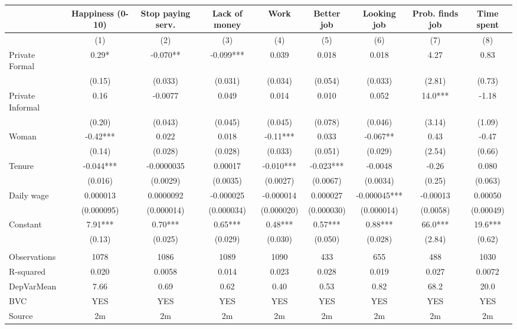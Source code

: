 \begin{tabular}{lcccccccc}
\toprule
      & Happiness (0-10) & Stop paying serv. & Lack of money & Work  & Better job & Looking job & Prob. finds job & Time spent \\
\midrule
\midrule
      & (1)   & (2)   & (3)   & (4)   & (5)   & (6)   & (7)   & (8) \\
\midrule
\midrule
Private Formal & 0.29* & -0.070** & -0.099*** & 0.039 & 0.018 & 0.018 & 4.27  & 0.83 \\
      & (0.15) & (0.033) & (0.031) & (0.034) & (0.054) & (0.033) & (2.81) & (0.73) \\
Private Informal & 0.16  & -0.0077 & 0.049 & 0.014 & 0.010 & 0.052 & 14.0*** & -1.18 \\
      & (0.20) & (0.043) & (0.045) & (0.045) & (0.078) & (0.046) & (3.14) & (1.09) \\
Woman & -0.42*** & 0.022 & 0.018 & -0.11*** & 0.033 & -0.067** & 0.43  & -0.47 \\
      & (0.14) & (0.028) & (0.028) & (0.033) & (0.051) & (0.029) & (2.54) & (0.66) \\
Tenure & -0.044*** & -0.0000035 & 0.00017 & -0.010*** & -0.023*** & -0.0048 & -0.26 & 0.080 \\
      & (0.016) & (0.0029) & (0.0035) & (0.0027) & (0.0067) & (0.0034) & (0.25) & (0.063) \\
Daily wage & 0.000013 & 0.0000092 & -0.000025 & -0.000014 & 0.000027 & -0.000045*** & -0.00013 & 0.00050 \\
      & (0.000095) & (0.000014) & (0.000034) & (0.000020) & (0.000030) & (0.000014) & (0.0058) & (0.00049) \\
Constant & 7.91*** & 0.70*** & 0.65*** & 0.48*** & 0.57*** & 0.88*** & 66.0*** & 19.6*** \\
      & (0.13) & (0.025) & (0.029) & (0.030) & (0.050) & (0.028) & (2.84) & (0.62) \\
      &       &       &       &       &       &       &       &  \\
\midrule
Observations & 1078  & 1086  & 1089  & 1090  & 433   & 655   & 488   & 1030 \\
R-squared & 0.020 & 0.0058 & 0.014 & 0.023 & 0.028 & 0.019 & 0.027 & 0.0072 \\
DepVarMean & 7.66  & 0.69  & 0.62  & 0.40  & 0.53  & 0.82  & 68.2  & 20.0 \\
BVC   & YES   & YES   & YES   & YES   & YES   & YES   & YES   & YES \\
Source & 2m    & 2m    & 2m    & 2m    & 2m    & 2m    & 2m    & 2m \\
\bottomrule
\bottomrule
\end{tabular}%
